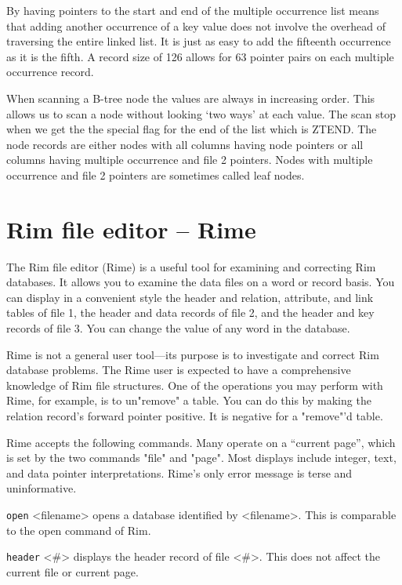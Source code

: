 \documentclass[11pt,a4paper]{report}
\begin{document}
By having pointers to the start and end of the  multiple  occurrence
list  means  that  adding another occurrence of a key value does not
involve the overhead of traversing the entire linked  list.   It  is
just  as easy to add the fifteenth occurrence as it is the fifth.  A
record size of 126 allows for 63  pointer  pairs  on  each  multiple
occurrence record.
 
When scanning a B-tree node the  values  are  always  in  increasing
order.   This allows us to scan a node without looking `two ways' at
each value.  The scan stop when we get the the special flag for  the
end  of the list which is ZTEND. The node records are either nodes
with all columns  having  node  pointers  or  all  columns  having
multiple  occurrence  and  file  2 pointers.  Nodes with multiple
occurrence and file 2 pointers are sometimes called leaf nodes.
 
 
\section{Rim file editor -- {\bf Rime}}
 
The Rim file editor (Rime) is a useful tool for examining and
correcting Rim databases.  It allows you to examine the data files
on a word or record basis.  You can display in a convenient style
the header and relation, attribute, and link tables of file 1,
the header and data records of file 2, and the header and
key records of file 3.
You can change the value of any word in the database.
 
Rime is not a general user tool---its purpose is to investigate
and correct Rim database problems.  The Rime user is expected
to have a comprehensive knowledge of Rim file structures.
One of the operations you may perform with Rime, for example,
is to un"remove" a table.  You can do this by making the
relation record's forward pointer positive.  It is negative
for a "remove"'d table.
 
\bigskip
 
Rime accepts the following commands.
Many operate on a ``current page'', which is set by the two
commands "file" and "page".
Most displays include integer, text, and data pointer
interpretations.
Rime's only error message is terse and uninformative.
 
 
\verb|open| <filename> \>
opens a database identified by <filename>.  This is comparable
to the open command of Rim.
 
\verb|header| <\#>\>
displays the header record of file <\#>.
This does not affect the current file or current page.
 
\end{document}
